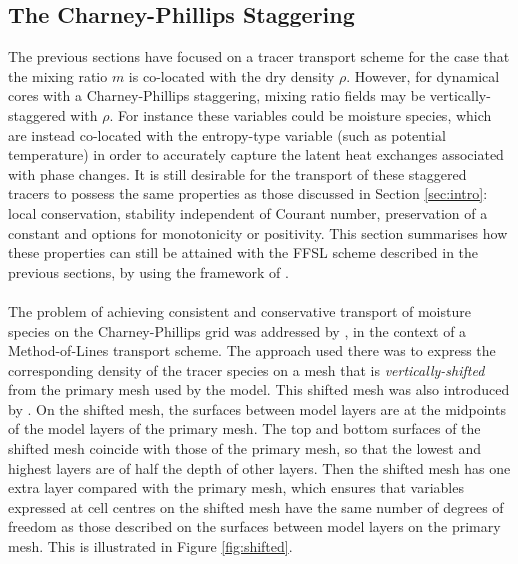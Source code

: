 \documentclass[11pt,a4paper]{article}
\begin{document}
\subsection{The Charney-Phillips Staggering} \label{sec:charney-phillips}
The previous sections have focused on a tracer transport scheme for the case that the mixing ratio $m$ is co-located with the dry density $\rho$.
However, for dynamical cores with a Charney-Phillips staggering, mixing ratio fields may be vertically-staggered with $\rho$.
For instance these variables could be moisture species, which are instead co-located with the entropy-type variable (such as potential temperature) in order to accurately capture the latent heat exchanges associated with phase changes.
It is still desirable for the transport of these staggered tracers to possess the same properties as those discussed in Section \ref{sec:intro}: local conservation, stability independent of Courant number, preservation of a constant and options for monotonicity or positivity.
This section summarises how these properties can still be attained with the FFSL scheme described in the previous sections, by using the framework of \citet{bendall2023solution}.
\\
\\
The problem of achieving consistent and conservative transport of moisture species on the Charney-Phillips grid was addressed by \citet{bendall2023solution}, in the context of a Method-of-Lines transport scheme.
The approach used there was to express the corresponding density of the tracer species on a mesh that is \textit{vertically-shifted} from the primary mesh used by the model.
This shifted mesh was also introduced by \citet{thuburn2022numerical}.
On the shifted mesh, the surfaces between model layers are at the midpoints of the model layers of the primary mesh.
The top and bottom surfaces of the shifted mesh coincide with those of the primary mesh, so that the lowest and highest layers are of half the depth of other layers.
Then the shifted mesh has one extra layer compared with the primary mesh, which ensures that variables expressed at cell centres on the shifted mesh have the same number of degrees of freedom as those described on the surfaces between model layers on the primary mesh.
This is illustrated in Figure \ref{fig:shifted}.
\end{document}
